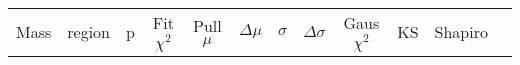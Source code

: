 \def\tableCaption{Statistical quantities for SM MC + CR fit}

\begin{table}[!htbp]
   \begin{center}
      \begin{scriptsize}
      \begin{tabular}{|c|c|c|c|c|c|c|c|c|c|c|c|}
         \hline
         {Mass} & {region} & {p} & {Fit $\chi^2$} & {Pull $\mu$} & {$\Delta\mu$} & {$\sigma$} & {$\Delta\sigma$} & {Gaus $\chi^2$} & {KS} & {Shapiro}  \\

\end{tabular}
\end{scriptsize}
\end{center}
\end{table}
